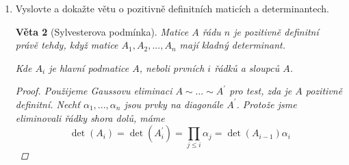 \documentclass[10pt,a4paper]{article}
\theoremstyle{plain}
\newtheorem{veta}{Věta}
\begin{document}
\begin{enumerate}
\begin{veta}
\begin{proof}
\begin{itemize}
Oba sčítance jsou kladné: První je z indukčního předpokladu pozitivně definitní matice, druhý protože se jedná o komplexně sdružená čísla.

Navíc alespoň jeden ze sčítanců musí být vždý ryze kladný: \begin{enumerate}
\item $\tilde{x} = 0 \implies x_1 \neq 0$, druhý sčítanec je nenulový
\item $\tilde{x} \neq 0$, první sčítanec je nenulový.

Tedy matice je pozitivně definitní.
\end{enumerate}
\item[$\implies$] $\tilde{x} \in \mathbb{C}^{n-1} \setminus 0$, vezmeme $x_1 = - \frac1\alpha a^H \tilde{x}$.

$x^T = \begin{array}{|c|c|}\hline x_1 & \tilde{x}^T \\ \hline \end{array}$
\hfill


Dle našeho výběru: \[ \sqrt{\alpha}x_1 + \frac{1}{\sqrt{\alpha}} a^H \tilde{x} = 0\]

Nyní \[ 0 < x^HAx = \tilde{x}^H(\tilde{A} - \frac{1}{\alpha} a a^H) \tilde{x} + 0 \cdot 0\]

A taky \[ {e^1}^HAe^1 = \alpha > 0\]

Takže $\tilde{A} - \frac1\alpha a a^H$ je pozitivně definitní a $\alpha > 0$

\end{itemize}

\end{proof}
\end{veta}

\item Vyslovte a dokažte větu o pozitivně definitních maticích a determinantech.


\begin{veta} [Sylvesterova podmínka]
Matice $A$ řádu $n$ je pozitivně definitní právě tehdy, když matice $A_1, A_2, ..., A_n$ mají kladný determinant.

Kde $A_i$ je hlavní podmatice $A$, neboli prvních $i$ řádků a sloupců $A$.
\begin{proof}
Použijeme Gaussovu eliminaci $A \sim ... \sim A^\prime$ pro test, zda je $A$ pozitivně definitní. Nechť $\alpha_1, ..., \alpha_n$ jsou prvky na diagonále $A^\prime$. Protože jsme eliminovali řádky shora dolů, máme
\[ \det(A_i) = \det(A^\prime_i) = \prod_{j \leq i} \alpha_j = \det(A_{i-1})\alpha_i \]


\end{proof}
\end{veta}
\end{enumerate}
\end{document}
